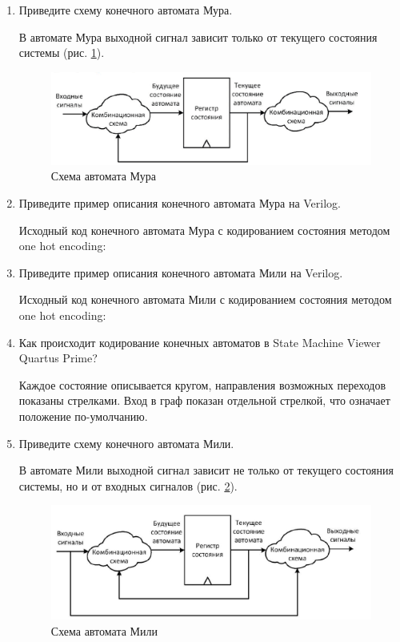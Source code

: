 \documentclass[a4paper,14pt]{article}
\begin{document}
	\begin{enumerate}
		\item Приведите схему конечного автомата Мура.
		
		В автомате Мура выходной сигнал зависит только от текущего состояния системы (рис. \ref{fig:q1}).
		
		\begin{figure}[H]
			\centering
			\includegraphics[width=\linewidth]{images/q1}
			\caption{Схема автомата Мура}
			\label{fig:q1}
		\end{figure}
	
		\item Приведите пример описания конечного автомата Мура на Verilog.
		
		Исходный код конечного автомата Мура с кодированием состояния методом one hot encoding:
		
		\item Приведите пример описания конечного автомата Мили на Verilog.
		
		Исходный код конечного автомата Мили с кодированием состояния методом one hot encoding:
		
		\item Как происходит кодирование конечных автоматов в State Machine Viewer Quartus
		Prime?
		
		Каждое состояние описывается кругом, направления возможных переходов показаны стрелками.
		Вход в граф показан отдельной стрелкой, что означает положение по-умолчанию.
		
		\item Приведите схему конечного автомата Мили.
		
		В автомате Мили выходной сигнал зависит не только от текущего состояния системы, но и от входных сигналов (рис. \ref{fig:q5}).
		
		\begin{figure}[H]
			\centering
			\includegraphics[width=\linewidth]{images/q5}
			\caption{Схема автомата Мили}
			\label{fig:q5}
		\end{figure}
		

\end{enumerate}
\end{document}
